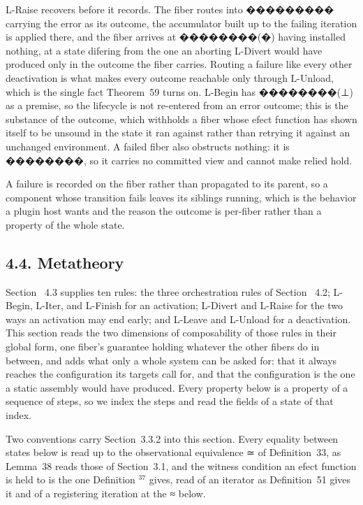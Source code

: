 \documentclass[
  10
]{article}
\begin{document}
L-Raise recovers before it records. The fiber routes into ���������
carrying the error as its outcome, the accumulator built up to the
failing iteration is applied there, and the fiber arrives at ��������(�)
having installed nothing, at a state difering from the one an aborting
L-Divert would have produced only in the outcome the fiber carries.
Routing a failure like every other deactivation is what makes every
outcome reachable only through L-Unload, which is the single fact
Theorem~59 turns on. L-Begin has ��������(⊥) as a premise, so the
lifecycle is not re-entered from an error outcome; this is the substance
of the outcome, which withholds a fiber whose efect function has shown
itself to be unsound in the state it ran against rather than retrying it
against an unchanged environment. A failed fiber also obstructs nothing:
it is ��������, so it carries no committed view and cannot make relied
hold.

A failure is recorded on the fiber rather than propagated to its parent,
so a component whose transition fails leaves its siblings running, which
is the behavior a plugin host wants and the reason the outcome is
per-fiber rather than a property of the whole state.

\subsection{4.4. Metatheory}\label{metatheory}

Section~ 4.3 supplies ten rules: the three orchestration rules of
Section~ 4.2; L-Begin, L-Iter, and L-Finish for an activation; L-Divert
and L-Raise for the two ways an activation may end early; and L-Leave
and L-Unload for a deactivation. This section reads the two dimensions
of composability of those rules in their global form, one fiber's
guarantee holding whatever the other fibers do in between, and adds what
only a whole system can be asked for: that it always reaches the
configuration its targets call for, and that the configuration is the
one a static assembly would have produced. Every property below is a
property of a sequence of steps, so we index the steps and read the
fields of a state of that index.

Two conventions carry Section~3.3.2 into this section. Every equality
between states below is read up to the observational equivalence ≃ of
Definition~33, as Lemma~38 reads those of Section~3.1, and the witness
condition an efect function is held to is the one Definition
\(^ { 3 7 }\) gives, read of an iterator as Definition~51 gives it and
of a registering iteration at the ≈ below.
\end{document}
